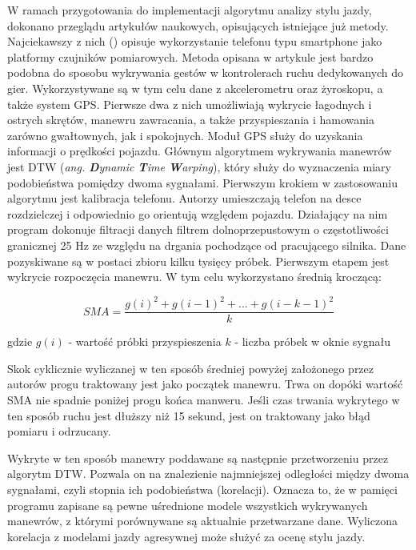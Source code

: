 W ramach przygotowania do implementacji algorytmu analizy stylu jazdy, dokonano przeglądu artykułów naukowych, opisujących istniejące już metody. Najciekawszy z nich (\cite{driving_analysis_article}) opisuje wykorzystanie telefonu typu smartphone jako platformy czujników pomiarowych. Metoda opisana w artykule jest bardzo podobna do sposobu wykrywania gestów w kontrolerach ruchu dedykowanych do gier.  Wykorzystywane są w tym celu dane z akcelerometru oraz żyroskopu, a także system GPS. Pierwsze dwa z nich umożliwiają wykrycie łagodnych i ostrych skrętów, manewru zawracania, a także przyspieszania i hamowania zarówno gwałtownych, jak i spokojnych. Moduł GPS służy do uzyskania informacji o prędkości pojazdu. Głównym algorytmem wykrywania manewrów jest DTW (\textit{ang. \textbf{D}ynamic \textbf{T}ime \textbf{W}arping}), który służy do wyznaczenia miary podobieństwa pomiędzy dwoma sygnałami. 
Pierwszym krokiem w zastosowaniu algorytmu jest kalibracja telefonu. Autorzy umieszczają telefon na desce rozdzielczej i odpowiednio go orientują względem pojazdu. Działający na nim program dokonuje filtracji danych filtrem dolnoprzepustowym o częstotliwości granicznej 25 Hz ze względu na drgania pochodzące od pracującego silnika. Dane pozyskiwane są w postaci zbioru kilku tysięcy próbek. 
Pierwszym etapem jest wykrycie rozpoczęcia manewru. W tym celu wykorzystano średnią kroczącą:

\begin{equation}
	SMA = \frac{g(i)^2 + g(i-1)^2 + ... + g(i-k-1)^2}{k}
\end{equation}

gdzie
$g(i)$ - wartość próbki przyspieszenia
$k$ - liczba próbek w oknie sygnału

Skok cyklicznie wyliczanej w ten sposób średniej powyżej założonego przez autorów progu traktowany jest jako początek manewru. Trwa on dopóki wartość SMA nie spadnie poniżej progu końca manweru. Jeśli czas trwania wykrytego w ten sposób ruchu jest dłuższy niż 15 sekund, jest on traktowany jako błąd pomiaru i odrzucany.

Wykryte w ten sposób manewry poddawane są następnie przetworzeniu przez algorytm DTW. Pozwala on na znalezienie najmniejszej odległości między dwoma sygnałami, czyli stopnia ich podobieństwa (korelacji). Oznacza to, że w pamięci programu zapisane są pewne uśrednione modele wszystkich wykrywanych manewrów, z którymi porównywane są aktualnie przetwarzane dane. Wyliczona korelacja z modelami jazdy agresywnej może służyć za ocenę stylu jazdy.

